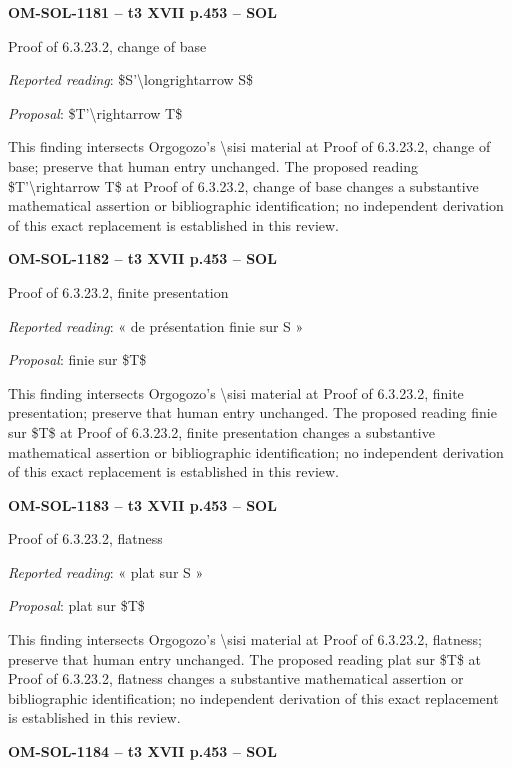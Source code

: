 \par\noindent\textbf{OM-SOL-1181 -- t3 XVII p.453 -- SOL}\par
Proof of 6.3.23.2, change of base\par
\emph{Reported reading}: \$S'\textbackslash{}longrightarrow S\$\par
\emph{Proposal}: \$T'\textbackslash{}rightarrow T\$\par
This finding intersects Orgogozo's \textbackslash{}sisi material at Proof of 6.3.23.2, change of base; preserve that human entry unchanged. The proposed reading \$T'\textbackslash{}rightarrow T\$ at Proof of 6.3.23.2, change of base changes a substantive mathematical assertion or bibliographic identification; no independent derivation of this exact replacement is established in this review.\par
\par\noindent\textbf{OM-SOL-1182 -- t3 XVII p.453 -- SOL}\par
Proof of 6.3.23.2, finite presentation\par
\emph{Reported reading}: « de présentation finie sur S »\par
\emph{Proposal}: finie sur \$T\$\par
This finding intersects Orgogozo's \textbackslash{}sisi material at Proof of 6.3.23.2, finite presentation; preserve that human entry unchanged. The proposed reading finie sur \$T\$ at Proof of 6.3.23.2, finite presentation changes a substantive mathematical assertion or bibliographic identification; no independent derivation of this exact replacement is established in this review.\par
\par\noindent\textbf{OM-SOL-1183 -- t3 XVII p.453 -- SOL}\par
Proof of 6.3.23.2, flatness\par
\emph{Reported reading}: « plat sur S »\par
\emph{Proposal}: plat sur \$T\$\par
This finding intersects Orgogozo's \textbackslash{}sisi material at Proof of 6.3.23.2, flatness; preserve that human entry unchanged. The proposed reading plat sur \$T\$ at Proof of 6.3.23.2, flatness changes a substantive mathematical assertion or bibliographic identification; no independent derivation of this exact replacement is established in this review.\par
\par\noindent\textbf{OM-SOL-1184 -- t3 XVII p.453 -- SOL}\par
